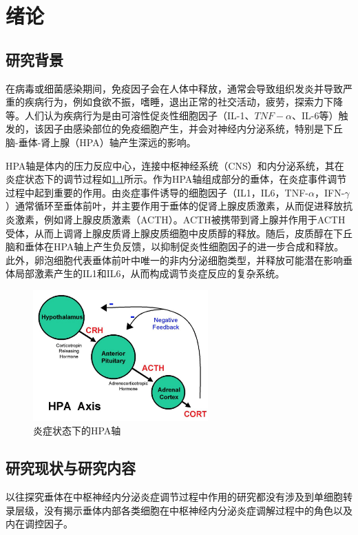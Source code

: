 
\chapter{绪论}
\section{研究背景}
  在病毒或细菌感染期间，免疫因子会在人体中释放，通常会导致组织发炎并导致严重的疾病行为，例如食欲不振，嗜睡，退出正常的社交活动，疲劳，探索力下降等。人们认为疾病行为是由可溶性促炎性细胞因子（IL-1、$TNF-\alpha$、IL-6等）触发的，该因子由感染部位的免疫细胞产生，并会对神经内分泌系统，特别是下丘脑-垂体-肾上腺（HPA）轴\cite{chrousos1995hypothalamic,shanks2000early}产生深远的影响。

  HPA轴是体内的压力反应中心，连接中枢神经系统（CNS）和内分泌系统，其在炎症状态下的调节过程如\ref{fig:HPA}所示。作为HPA轴组成部分的垂体，在炎症事件调节过程中起到重要的作用。由炎症事件诱导的细胞因子（IL1，IL6，TNF-$\alpha$，IFN-$\gamma$）通常循环至垂体前叶，并主要作用于垂体的促肾上腺皮质激素，从而促进释放抗炎激素，例如肾上腺皮质激素（ACTH）。ACTH被携带到肾上腺并作用于ACTH受体，从而上调肾上腺皮质肾上腺皮质细胞中皮质醇的释放。随后，皮质醇在下丘脑和垂体在HPA轴上产生负反馈，以抑制促炎性细胞因子的进一步合成和释放。此外，卵泡细胞代表垂体前叶中唯一的非内分泌细胞类型，并释放可能潜在影响垂体局部激素产生的IL1和IL6，从而构成调节炎症反应的复杂系统。

\begin{figure}[!htb]
  \centering
  \includegraphics[width=0.6\textwidth]{figs/HPA.png}
  \caption{炎症状态下的HPA轴}
  \label{fig:HPA}
\end{figure}

\section{研究现状与研究内容}
  以往探究垂体在中枢神经内分泌炎症调节过程中作用的研究\cite{chrousos1995hypothalamic,shanks2000early}都没有涉及到单细胞转录层级，没有揭示垂体内部各类细胞在中枢神经内分泌炎症调解过程中的角色以及内在调控因子。

